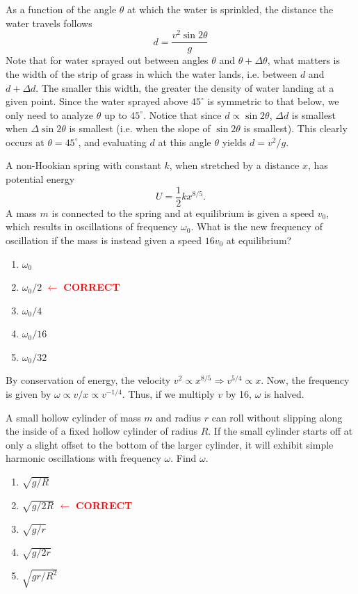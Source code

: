 \documentclass[11pt]{scrartcl}
\begin{document}
\begin{sol}
    As a function of the angle $\theta$ at which the water is sprinkled, the distance the water travels follows $$d=\frac{v^2\sin 2\theta}{g}$$Note that for water sprayed out between angles $\theta$ and $\theta+\Delta \theta$, what matters is the width of the strip of grass in which the water lands, i.e. between $d$ and $d+\Delta d$. The smaller this width, the greater the density of water landing at a given point. Since the water sprayed above $45^\circ$ is symmetric to that below, we only need to analyze $\theta$ up to $45^\circ$. Notice that since $d\propto \sin 2\theta$, $\Delta d$ is smallest when  $\Delta \sin2\theta$ is smallest (i.e. when the slope of $\sin2\theta$ is smallest). This clearly occurs at $\theta=45^\circ$, and evaluating $d$ at this angle $\theta$ yields $d=v^2/g$. 
\end{sol}

\begin{prob}
    A non-Hookian spring with constant $k$, when stretched by a distance $x$, has potential energy $$U=\frac12kx^{8/5}.$$ A mass $m$ is connected to the spring and at equilibrium is given a speed $v_0$, which results in oscillations of frequency $\omega_0$. What is the new frequency of oscillation if the mass is instead given a speed $16v_0$ at equilibrium?
    \begin{enumerate}[label = (\Alph*)]
\item $\omega_0$
\item $\omega_0/2$ \textcolor{red}{$\leftarrow$ \textbf{CORRECT}}
\item $\omega_0/4$
\item $\omega_0/16$
\item $\omega_0/32$
\end{enumerate}
\end{prob}

\begin{sol}
    By conservation of energy, the velocity $v^2\propto x^{8/5}\Rightarrow v^{5/4}\propto x$. Now, the frequency is given by $\omega\propto v/x\propto v^{-1/4}$. Thus, if we multiply $v$ by 16, $\omega$ is halved.
\end{sol}

\begin{prob}
    A small hollow cylinder of mass $m$ and radius $r$ can roll without slipping along the inside of a fixed hollow cylinder of radius $R$. If the small cylinder starts off at only a slight offset to the bottom of the larger cylinder, it will exhibit simple harmonic oscillations with frequency $\omega$. Find $\omega$. 
    \begin{enumerate}[label = (\Alph*)]
\item $\sqrt{g/R}$
\item $\sqrt{g/2R}$ \textcolor{red}{$\leftarrow$ \textbf{CORRECT}}
\item $\sqrt{g/r}$
\item $\sqrt{g/2r}$
\item $\sqrt{gr/R^2}$
\end{enumerate}
\end{prob}
\end{document}
